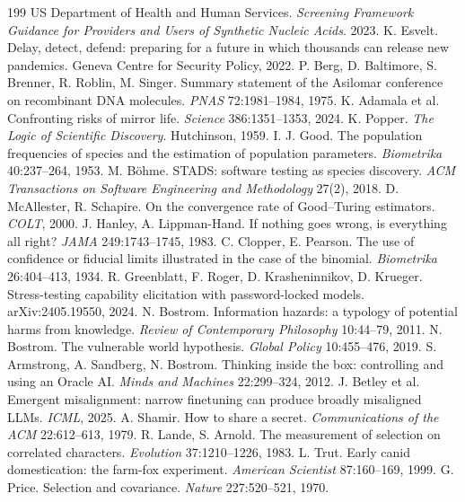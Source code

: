 \documentclass[10pt,twocolumn]{article}
\theoremstyle{plain}
\theoremstyle{definition}
\begin{document}
\begin{thebibliography}{199}
 US Department of Health and Human Services. \emph{Screening Framework Guidance for Providers and Users of Synthetic Nucleic Acids}. 2023.
 K. Esvelt. Delay, detect, defend: preparing for a future in which thousands can release new pandemics. Geneva Centre for Security Policy, 2022.
 P. Berg, D. Baltimore, S. Brenner, R. Roblin, M. Singer. Summary statement of the Asilomar conference on recombinant DNA molecules. \emph{PNAS} 72:1981--1984, 1975.
 K. Adamala et al. Confronting risks of mirror life. \emph{Science} 386:1351--1353, 2024.
 K. Popper. \emph{The Logic of Scientific Discovery}. Hutchinson, 1959.
 I. J. Good. The population frequencies of species and the estimation of population parameters. \emph{Biometrika} 40:237--264, 1953.
 M. B\"ohme. STADS: software testing as species discovery. \emph{ACM Transactions on Software Engineering and Methodology} 27(2), 2018.
 D. McAllester, R. Schapire. On the convergence rate of Good--Turing estimators. \emph{COLT}, 2000.
 J. Hanley, A. Lippman-Hand. If nothing goes wrong, is everything all right? \emph{JAMA} 249:1743--1745, 1983.
 C. Clopper, E. Pearson. The use of confidence or fiducial limits illustrated in the case of the binomial. \emph{Biometrika} 26:404--413, 1934.
 R. Greenblatt, F. Roger, D. Krasheninnikov, D. Krueger. Stress-testing capability elicitation with password-locked models. arXiv:2405.19550, 2024.
 N. Bostrom. Information hazards: a typology of potential harms from knowledge. \emph{Review of Contemporary Philosophy} 10:44--79, 2011.
 N. Bostrom. The vulnerable world hypothesis. \emph{Global Policy} 10:455--476, 2019.
 S. Armstrong, A. Sandberg, N. Bostrom. Thinking inside the box: controlling and using an Oracle AI. \emph{Minds and Machines} 22:299--324, 2012.
 J. Betley et al. Emergent misalignment: narrow finetuning can produce broadly misaligned LLMs. \emph{ICML}, 2025.
 A. Shamir. How to share a secret. \emph{Communications of the ACM} 22:612--613, 1979.
 R. Lande, S. Arnold. The measurement of selection on correlated characters. \emph{Evolution} 37:1210--1226, 1983.
 L. Trut. Early canid domestication: the farm-fox experiment. \emph{American Scientist} 87:160--169, 1999.
 G. Price. Selection and covariance. \emph{Nature} 227:520--521, 1970.

\end{thebibliography}
\end{document}
